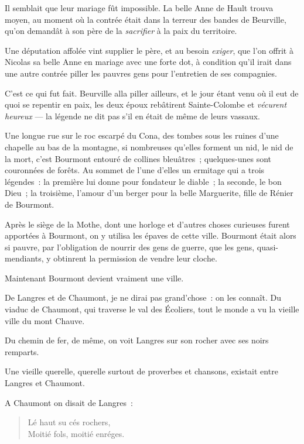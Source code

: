 \documentclass[french,twoside]{book} %
\begin{document}
Il semblait que leur mariage fût impossible. La belle Anne de Hault trouva moyen, au moment où la contrée était dans la terreur des bandes de  Beurville, qu’on demandât à son père de la \emph{sacrifier} à la paix du territoire.\par
Une députation affolée vint supplier le père, et au besoin \emph{exiger}, que l’on offrit à Nicolas sa belle Anne en mariage avec une forte dot, à condition qu’il irait dans une autre contrée piller les pauvres gens pour l’entretien de ses compagnies.\par
C’est ce qui fut fait. Beurville alla piller ailleurs, et le jour étant venu où il eut de quoi se repentir en paix, les deux époux rebâtirent Sainte-Colombe et \emph{vécurent heureux} — la légende ne dit pas s’il en était de même de leurs vassaux.\par
Une longue rue sur le roc escarpé du Cona, des tombes sous les ruines d’une chapelle au bas de la montagne, si nombreuses qu’elles forment un nid, le nid de la mort, c’est Bourmont entouré de collines bleuâtres ; quelques-unes sont couronnées de forêts. Au sommet de l’une d’elles un ermitage qui a trois légendes : la première lui donne pour fondateur le diable ; la seconde, le bon Dieu ; la troisième, l’amour d’un berger pour la belle Marguerite, fille de Rénier de Bourmont.\par
Après le siège de la Mothe, dont une horloge et d’autres choses curieuses furent apportées à Bourmont, on y utilisa les épaves de cette ville. Bourmont était alors si pauvre, par l’obligation  de nourrir des gens de guerre, que les gens, quasi-mendiants, y obtinrent la permission de vendre leur cloche.\par
Maintenant Bourmont devient vraiment une ville.\par
De Langres et de Chaumont, je ne dirai pas grand’chose : on les connaît. Du viaduc de Chaumont, qui traverse le val des Écoliers, tout le monde a vu la vieille ville du mont Chauve.\par
Du chemin de fer, de même, on voit Langres sur son rocher avec ses noirs remparts.\par
Une vieille querelle, querelle surtout de proverbes et chansons, existait entre Langres et Chaumont.\par
A Chaumont on disait de Langres :\par


\begin{verse}
Lé haut su cés rochers,\\
Moitié fols, moitié enréges.\\
\end{verse}
\end{document}
